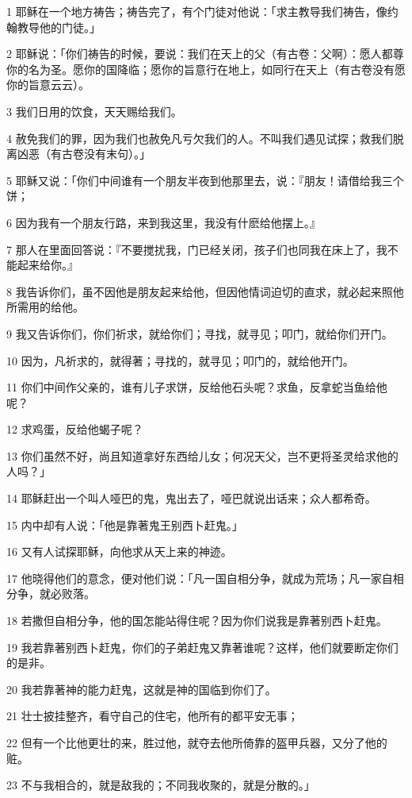 \par 1 耶稣在一个地方祷告；祷告完了，有个门徒对他说：「求主教导我们祷告，像约翰教导他的门徒。」
\par 2 耶稣说：「你们祷告的时候，要说：我们在天上的父（有古卷：父啊）：愿人都尊你的名为圣。愿你的国降临；愿你的旨意行在地上，如同行在天上（有古卷没有愿你的旨意云云）。
\par 3 我们日用的饮食，天天赐给我们。
\par 4 赦免我们的罪，因为我们也赦免凡亏欠我们的人。不叫我们遇见试探；救我们脱离凶恶（有古卷没有末句）。」
\par 5 耶稣又说：「你们中间谁有一个朋友半夜到他那里去，说：『朋友！请借给我三个饼；
\par 6 因为我有一个朋友行路，来到我这里，我没有什麽给他摆上。』
\par 7 那人在里面回答说：『不要搅扰我，门已经关闭，孩子们也同我在床上了，我不能起来给你。』
\par 8 我告诉你们，虽不因他是朋友起来给他，但因他情词迫切的直求，就必起来照他所需用的给他。
\par 9 我又告诉你们，你们祈求，就给你们；寻找，就寻见；叩门，就给你们开门。
\par 10 因为，凡祈求的，就得著；寻找的，就寻见；叩门的，就给他开门。
\par 11 你们中间作父亲的，谁有儿子求饼，反给他石头呢？求鱼，反拿蛇当鱼给他呢？
\par 12 求鸡蛋，反给他蝎子呢？
\par 13 你们虽然不好，尚且知道拿好东西给儿女；何况天父，岂不更将圣灵给求他的人吗？」
\par 14 耶稣赶出一个叫人哑巴的鬼，鬼出去了，哑巴就说出话来；众人都希奇。
\par 15 内中却有人说：「他是靠著鬼王别西卜赶鬼。」
\par 16 又有人试探耶稣，向他求从天上来的神迹。
\par 17 他晓得他们的意念，便对他们说：「凡一国自相分争，就成为荒场；凡一家自相分争，就必败落。
\par 18 若撒但自相分争，他的国怎能站得住呢？因为你们说我是靠著别西卜赶鬼。
\par 19 我若靠著别西卜赶鬼，你们的子弟赶鬼又靠著谁呢？这样，他们就要断定你们的是非。
\par 20 我若靠著神的能力赶鬼，这就是神的国临到你们了。
\par 21 壮士披挂整齐，看守自己的住宅，他所有的都平安无事；
\par 22 但有一个比他更壮的来，胜过他，就夺去他所倚靠的盔甲兵器，又分了他的赃。
\par 23 不与我相合的，就是敌我的；不同我收聚的，就是分散的。」
